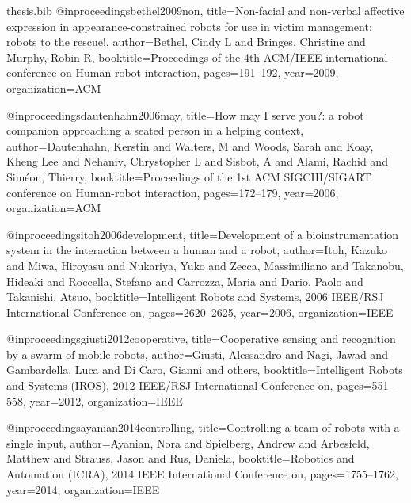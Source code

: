\documentclass[oneside, a4paper, 12pt]{memoir}
\begin{document}
\begin{filecontents}{thesis.bib}
@inproceedings{bethel2009non,
  title={Non-facial and non-verbal affective expression in appearance-constrained robots for use in victim management: robots to the rescue!},
  author={Bethel, Cindy L and Bringes, Christine and Murphy, Robin R},
  booktitle={Proceedings of the 4th ACM/IEEE international conference on Human robot interaction},
  pages={191--192},
  year={2009},
  organization={ACM}
}

@inproceedings{dautenhahn2006may,
  title={How may I serve you?: a robot companion approaching a seated person in a helping context},
  author={Dautenhahn, Kerstin and Walters, M and Woods, Sarah and Koay, Kheng Lee and Nehaniv, Chrystopher L and Sisbot, A and Alami, Rachid and Sim{\'e}on, Thierry},
  booktitle={Proceedings of the 1st ACM SIGCHI/SIGART conference on Human-robot interaction},
  pages={172--179},
  year={2006},
  organization={ACM}
}

@inproceedings{itoh2006development,
  title={Development of a bioinstrumentation system in the interaction between a human and a robot},
  author={Itoh, Kazuko and Miwa, Hiroyasu and Nukariya, Yuko and Zecca, Massimiliano and Takanobu, Hideaki and Roccella, Stefano and Carrozza, Maria and Dario, Paolo and Takanishi, Atsuo},
  booktitle={Intelligent Robots and Systems, 2006 IEEE/RSJ International Conference on},
  pages={2620--2625},
  year={2006},
  organization={IEEE}
}

@inproceedings{giusti2012cooperative,
  title={Cooperative sensing and recognition by a swarm of mobile robots},
  author={Giusti, Alessandro and Nagi, Jawad and Gambardella, Luca and Di Caro, Gianni and others},
  booktitle={Intelligent Robots and Systems (IROS), 2012 IEEE/RSJ International Conference on},
  pages={551--558},
  year={2012},
  organization={IEEE}
}

@inproceedings{ayanian2014controlling,
  title={Controlling a team of robots with a single input},
  author={Ayanian, Nora and Spielberg, Andrew and Arbesfeld, Matthew and Strauss, Jason and Rus, Daniela},
  booktitle={Robotics and Automation (ICRA), 2014 IEEE International Conference on},
  pages={1755--1762},
  year={2014},
  organization={IEEE}
}

\end{filecontents}



\end{document}
